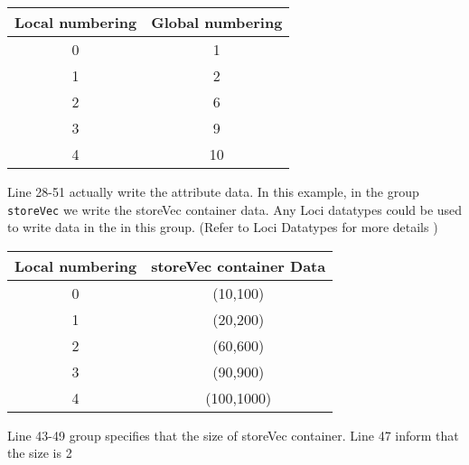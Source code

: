 \begin{center}
\begin{tabular}[h]{|c|c|} \hline
Local numbering & Global numbering \\ \hline
0   &  1         \\
1   &  2         \\
2   &  6         \\
3   &  9         \\
4   &  10        \\ \hline
\end{tabular}
\end{center}

\par Line 28-51 actually write the attribute data. In this example, in
the group {\tt storeVec}
we write the storeVec container data. Any Loci datatypes could
be used to write data in
the in this group. (Refer to Loci Datatypes for more details )

\begin{center}
\begin{tabular}[h]{|c|c|} \hline
Local numbering & storeVec container Data \\ \hline
0   &  (10,100)         \\
1   &  (20,200)         \\
2   &  (60,600)         \\
3   &  (90,900)         \\
4   &  (100,1000)      \\ \hline
\end{tabular}
\end{center}

\par Line 43-49 group specifies that the size of storeVec
container. Line 47 inform that the size is 2

